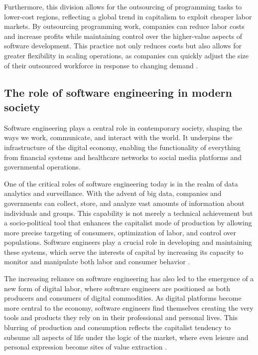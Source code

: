 \begin{refsection}
Furthermore, this division allows for the outsourcing of programming tasks to lower-cost regions, reflecting a global trend in capitalism to exploit cheaper labor markets. By outsourcing programming work, companies can reduce labor costs and increase profits while maintaining control over the higher-value aspects of software development. This practice not only reduces costs but also allows for greater flexibility in scaling operations, as companies can quickly adjust the size of their outsourced workforce in response to changing demand \cite[pp.~112-114]{braverman_1974}.

\subsection{The role of software engineering in modern society}
Software engineering plays a central role in contemporary society, shaping the ways we work, communicate, and interact with the world. It underpins the infrastructure of the digital economy, enabling the functionality of everything from financial systems and healthcare networks to social media platforms and governmental operations.

One of the critical roles of software engineering today is in the realm of data analytics and surveillance. With the advent of big data, companies and governments can collect, store, and analyze vast amounts of information about individuals and groups. This capability is not merely a technical achievement but a socio-political tool that enhances the capitalist mode of production by allowing more precise targeting of consumers, optimization of labor, and control over populations. Software engineers play a crucial role in developing and maintaining these systems, which serve the interests of capital by increasing its capacity to monitor and manipulate both labor and consumer behavior \cite[pp.~197-200]{foucault_2020}.

The increasing reliance on software engineering has also led to the emergence of a new form of digital labor, where software engineers are positioned as both producers and consumers of digital commodities. As digital platforms become more central to the economy, software engineers find themselves creating the very tools and products they rely on in their professional and personal lives. This blurring of production and consumption reflects the capitalist tendency to subsume all aspects of life under the logic of the market, where even leisure and personal expression become sites of value extraction \cite[pp.~334-336]{marx_2008}.


\end{refsection}
